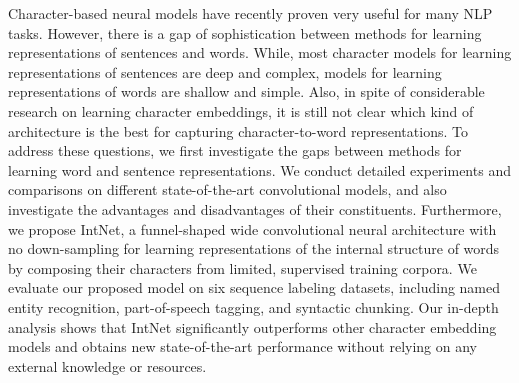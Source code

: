 Character-based neural models have recently proven very useful for many NLP tasks. However, there is a gap of sophistication between methods for learning representations of sentences and words. While, most character models for learning representations of sentences are deep and complex, models for learning representations of words are shallow and simple. Also, in spite of considerable research on learning character embeddings, it is still not clear which kind of architecture is the best for capturing character-to-word representations. To address these questions, we first investigate the gaps between methods for learning word and sentence representations. We conduct detailed experiments and comparisons on different state-of-the-art convolutional models, and also investigate the advantages and disadvantages of their constituents. Furthermore, we propose IntNet, a funnel-shaped wide convolutional neural architecture with no down-sampling for learning representations of the internal structure of words by composing their characters from limited, supervised training corpora. We evaluate our proposed model on six sequence labeling datasets, including named entity recognition, part-of-speech tagging, and syntactic chunking. Our in-depth analysis shows that IntNet significantly outperforms other character embedding models and obtains new state-of-the-art performance without relying on any external knowledge or resources.
